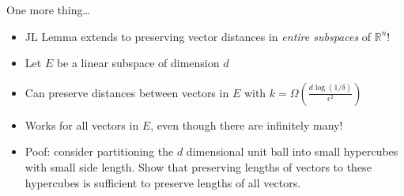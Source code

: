\begin{frame}{One more thing\ldots{}}
\protect\hypertarget{one-more-thing}{}
\begin{itemize}
\tightlist
\item
  JL Lemma extends to preserving vector distances in
  \textit{entire subspaces} of \(\mathbb{R}^n\)!
\item
  Let \(E\) be a linear subspace of dimension \(d\)
\item
  Can preserve distances between vectors in \(E\) with
  \(k = \Omega\left(\frac{d\log(1/\delta)}{\epsilon^2}\right)\)
\item
  Works for all vectors in \(E\), even though there are infinitely many!
\item
  Poof: consider partitioning the \(d\) dimensional unit ball into small
  hypercubes with small side length. Show that preserving lengths of
  vectors to these hypercubes is sufficient to preserve lengths of all
  vectors.
\end{itemize}
\end{frame}
